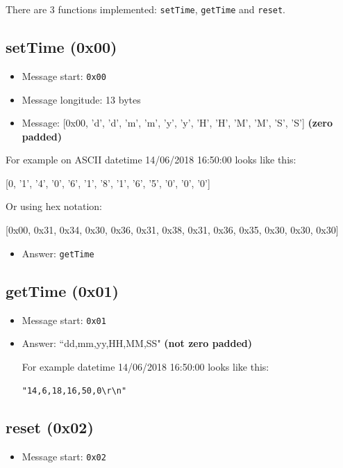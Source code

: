\documentclass[10pt, letterpaper]{article} %
\begin{document}
	There are 3 functions implemented: \verb|setTime|, \verb|getTime| and \verb|reset|.
	
	\subsection{setTime (0x00)}
		\begin{itemize}
			\item Message start: \verb|0x00|
			\item Message longitude: 13 bytes
			\item Message: [0x00, 'd', 'd', 'm', 'm', 'y', 'y', 'H', 'H', 'M', 'M', 'S', 'S'] \textbf{(zero padded)}
		\end{itemize}
		For example on ASCII datetime 14/06/2018 16:50:00 looks like this:
		\begin{center}
			[0, '1', '4', '0', '6', '1', '8', '1', '6', '5', '0', '0', '0']
		\end{center}
		Or using hex notation:
		\begin{center}
			[0x00, 0x31, 0x34, 0x30, 0x36, 0x31, 0x38, 0x31, 0x36, 0x35, 0x30, 0x30, 0x30]
		\end{center}
	\begin{itemize}
		\item Answer: \verb|getTime|
	\end{itemize}
	\subsection{getTime (0x01)}
		\begin{itemize}
			\item Message start: \verb|0x01|
			\item Answer: ``dd,mm,yy,HH,MM,SS" \textbf{(not zero padded)}
			
			For example datetime 14/06/2018 16:50:00 looks like this:
			\begin{center}
				\verb|"14,6,18,16,50,0\r\n"|
			\end{center}
		\end{itemize}
	\subsection{reset (0x02)}
		\begin{itemize}
			\item Message start: \verb|0x02|
		\end{itemize}
\end{document}

